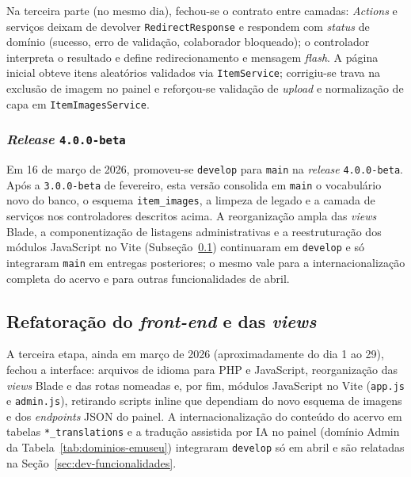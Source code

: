 Na terceira parte (no mesmo dia), fechou-se o contrato entre camadas: \textit{Actions} e serviços deixam de devolver \texttt{RedirectResponse} e respondem com \textit{status} de domínio (sucesso, erro de validação, colaborador bloqueado); o controlador interpreta o resultado e define redirecionamento e mensagem \textit{flash}. A página inicial obteve itens aleatórios validados via \texttt{ItemService}; corrigiu-se trava na exclusão de imagem no painel e reforçou-se validação de \textit{upload} e normalização de capa em \texttt{ItemImagesService}.


\subsubsection{\textit{Release} \texttt{4.0.0-beta}}\label{sec:dev-release-400-beta}

Em 16 de março de 2026, promoveu-se \texttt{develop} para \texttt{main} na \textit{release} \texttt{4.0.0-beta}. Após a \texttt{3.0.0-beta} de fevereiro, esta versão consolida em \texttt{main} o vocabulário novo do banco, o esquema \texttt{item\_images}, a limpeza de legado e a camada de serviços nos controladores descritos acima. A reorganização ampla das \textit{views} Blade, a componentização de listagens administrativas e a reestruturação dos módulos JavaScript no Vite (Subseção~\ref{sec:dev-refatoracao-views}) continuaram em \texttt{develop} e só integraram \texttt{main} em entregas posteriores; o mesmo vale para a internacionalização completa do acervo e para outras funcionalidades de abril.


\subsection{Refatoração do \textit{front-end} e das \textit{views}}\label{sec:dev-refatoracao-views}

A terceira etapa, ainda em março de 2026 (aproximadamente do dia 1 ao 29), fechou a interface: arquivos de idioma para PHP e JavaScript, reorganização das \textit{views} Blade e das rotas nomeadas e, por fim, módulos JavaScript no Vite (\texttt{app.js} e \texttt{admin.js}), retirando scripts inline que dependiam do novo esquema de imagens e dos \textit{endpoints} JSON do painel. A internacionalização do conteúdo do acervo em tabelas \texttt{*\_translations} e a tradução assistida por IA no painel (domínio Admin da Tabela~\ref{tab:dominios-emuseu}) integraram \texttt{develop} só em abril e são relatadas na Seção~\ref{sec:dev-funcionalidades}.


